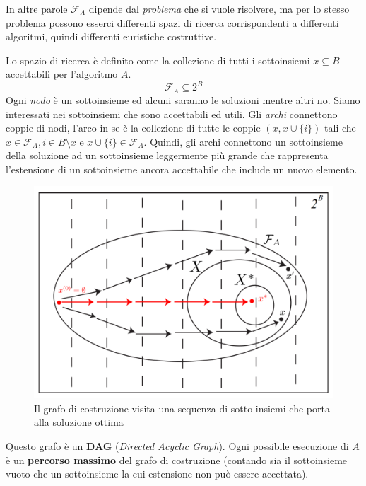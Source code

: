\documentclass{article}
\begin{document}
    In altre parole $\mathcal{F}_A$ dipende dal \textit{problema} che si vuole risolvere, ma per lo stesso
    problema possono esserci differenti spazi di ricerca corrispondenti a differenti
    algoritmi, quindi differenti euristiche costruttive.

    Lo spazio di ricerca è definito come la collezione di tutti i sottoinsiemi $x\subseteq B$ accettabili
    per l'algoritmo $A$.
$$\mathcal{F}_A\subseteq 2^B$$
Ogni \textit{nodo} è un sottoinsieme ed alcuni saranno le soluzioni mentre altri no. Siamo interessati nei
sottoinsiemi che sono accettabili ed utili. Gli \textit{archi} connettono coppie di nodi,
l'arco in se è la collezione di tutte le coppie $(x,x\cup\{i\})$ tali che
$x\in \mathcal{F}_A ,i\in B\setminus x$ e $x\cup\{i\}\in \mathcal{F}_A$. Quindi, gli archi connettono
un sottoinsieme della soluzione ad un sottoinsieme leggermente più grande che rappresenta l'estensione
di un sottoinsieme ancora accettabile che include un nuovo elemento.
\begin{figure}[H]
    \centering
    \includegraphics[scale=0.6]{images/cons_graph.png}
    \caption{Il grafo di costruzione visita una sequenza di sotto insiemi che porta alla soluzione ottima}
\end{figure}
Questo grafo è un \textbf{DAG} (\textit{Directed Acyclic Graph}). Ogni possibile esecuzione di
$A$ è un \textbf{percorso massimo} del grafo di costruzione (contando sia il sottoinsieme
vuoto che un sottoinsieme la cui estensione non può essere accettata).
\end{document}
